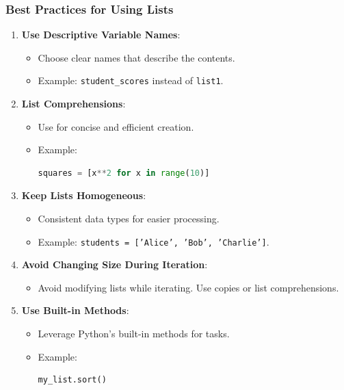 \documentclass{beamer}
\begin{document}
\begin{frame}[fragile]
    \frametitle{Best Practices for Using Lists}
    \begin{enumerate}
        \item \textbf{Use Descriptive Variable Names}:
            \begin{itemize}
                \item Choose clear names that describe the contents. 
                \item Example: \texttt{student\_scores} instead of \texttt{list1}.
            \end{itemize}

        \item \textbf{List Comprehensions}:
            \begin{itemize}
                \item Use for concise and efficient creation.
                \item Example:
                \begin{lstlisting}[language=Python]
squares = [x**2 for x in range(10)]
                \end{lstlisting}
            \end{itemize}

        \item \textbf{Keep Lists Homogeneous}:
            \begin{itemize}
                \item Consistent data types for easier processing.
                \item Example: \texttt{students = ['Alice', 'Bob', 'Charlie']}.
            \end{itemize}

        \item \textbf{Avoid Changing Size During Iteration}:
            \begin{itemize}
                \item Avoid modifying lists while iterating. Use copies or list comprehensions.
            \end{itemize}

        \item \textbf{Use Built-in Methods}:
            \begin{itemize}
                \item Leverage Python's built-in methods for tasks.
                \item Example:
                \begin{lstlisting}[language=Python]
my_list.sort()
                \end{lstlisting}
            \end{itemize}
    \end{enumerate}
\end{frame}
\end{document}
